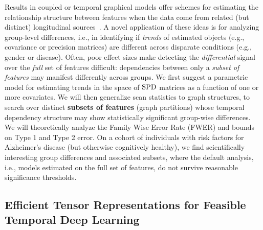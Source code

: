 Results in coupled or temporal graphical models offer schemes for estimating the relationship structure 
between features when the data come from
related (but distinct) longitudinal sources~\citep{zhou2010time,caffo}. A novel application of these ideas is for analyzing group-level differences, i.e., in identifying if {\em trends} of estimated objects (e.g., 
covariance or precision matrices) are different across disparate conditions (e.g., gender or disease).
Often, poor effect sizes make detecting the \textit{differential} signal 
over the {\em full} set of features difficult: 
dependencies between only a {\em subset of features} may manifest differently across groups.
We first suggest
a parametric model 
for estimating trends in the space of $\operatorname*{SPD}$ matrices as a function of one or more covariates.
We will then generalize scan statistics to graph structures, 
to search over distinct \textbf{subsets of features} (graph partitions) whose temporal dependency structure may show statistically 
significant group-wise differences.
We will theoretically analyze the Family Wise Error Rate (FWER) and bounds on Type 1 and Type 2 error. 
On a cohort of individuals with risk factors for Alzheimer's disease (but otherwise cognitively healthy), 
we 
find scientifically interesting 
group differences and associated subsets, where the default analysis, 
i.e., models estimated on the full set of features, do not survive reasonable 
significance thresholds. 


\subsection{Efficient Tensor Representations for Feasible Temporal Deep Learning}

